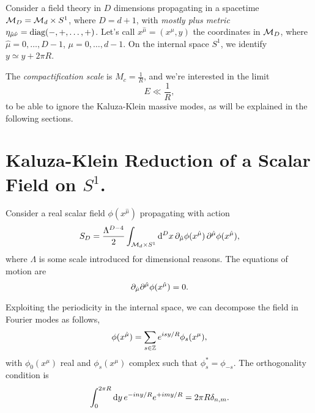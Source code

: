 Consider a field theory in $D$ dimensions propagating in a spacetime $\mathcal{M}_D = \mathcal{M}_d \times S^1$, where $D = d+1$, with \emph{mostly plus metric} $\eta_{\hat{\mu}\hat{\nu}}= \textup{diag}(-,+,\dots,+)$. Let's call $x^{\hat{\mu}} = (x^\mu, y)$ the coordinates in $\mathcal{M}_D$, where $\hat{\mu} = 0, \dots, D-1$, $\mu = 0, \dots, d-1$. On the internal space $S^1$, we identify $y \simeq y + 2\pi R$. 

The \emph{compactification scale} is $M_c = \frac{1}{R}$, and we're interested in the limit
\begin{equation}
    E \ll \frac{1}{R},
\end{equation}
to be able to ignore the Kaluza-Klein massive modes, as will be explained in the following sections.

\section{Kaluza-Klein Reduction of a Scalar Field on \texorpdfstring{$S^1$}{S1}.}
Consider a real scalar field $\phi(x^{\hat{\mu}})$ propagating with action
\begin{equation}
    S_{D} = \frac{\Lambda^{D-4}}{2} \int_{\mathcal{M}_{d} \times S^1} \mathop{}\!\mathrm{d}^D x \,  \partial_{\hat{\mu}} \phi(x^{\hat{\mu}}) \, \partial^{\hat{\mu}} \phi(x^{\hat{\mu}}),
\end{equation}
where $\Lambda$ is some scale introduced for dimensional reasons. The equations of motion are
\begin{equation}\label{eq:scalar-eq-motion}
    \partial_{\hat{\mu}} \partial^{\hat{\mu}}  \phi(x^{\hat{\mu}}) = 0.
\end{equation}

Exploiting the periodicity in the internal space, we can decompose the field in Fourier modes as follows,
\begin{equation}\label{eq:scalar-expansion}
    \phi(x^{\hat{\mu}}) = \sum_{s \in \mathbb{Z}} e^{isy/R} \phi_s(x^\mu),
\end{equation}
with $\phi_0(x^\mu)$ real and $\phi_s(x^\mu)$ complex such that $\phi^*_s = \phi_{-s}$. The orthogonality condition is
\begin{equation}\label{eq:orthogonality}
    \int_0^{2\pi R} \mathop{}\!\mathrm{d} y \, e^{-iny/R} e^{+imy/R} = 2\pi R \delta_{n,m} .
\end{equation}

